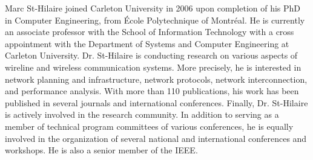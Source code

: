 \documentclass[10pt,journal,compsoc]{IEEEtran}
\begin{document}
\begin{IEEEbiography}
{Marc St-Hilaire}
joined Carleton University in 2006 upon completion of his PhD in Computer Engineering, from \'Ecole Polytechnique of Montr\'eal. He is currently an associate professor with the School of Information Technology with a cross appointment with the Department of Systems and Computer Engineering at Carleton University. Dr. St-Hilaire is conducting research on various aspects of wireline and wireless communication systems. More precisely, he is interested in network planning and infrastructure, network protocols, network interconnection, and performance analysis. With more than 110 publications, his work has been published in several journals and international conferences. Finally, Dr. St-Hilaire is actively involved in the research community. In addition to serving as a member of technical program committees of various conferences, he is equally involved in the organization of several national and international conferences and workshops. He is also a senior member of the IEEE.
\end{IEEEbiography}
\end{document}
